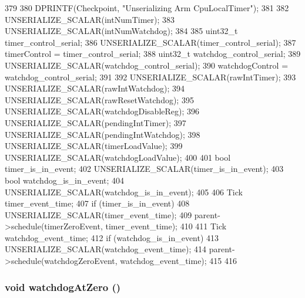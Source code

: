 \begin{DoxyCode}
379 {
380     DPRINTF(Checkpoint, "Unserializing Arm CpuLocalTimer\n");
381 
382     UNSERIALIZE_SCALAR(intNumTimer);
383     UNSERIALIZE_SCALAR(intNumWatchdog);
384 
385     uint32_t timer_control_serial;
386     UNSERIALIZE_SCALAR(timer_control_serial);
387     timerControl = timer_control_serial;
388     uint32_t watchdog_control_serial;
389     UNSERIALIZE_SCALAR(watchdog_control_serial);
390     watchdogControl = watchdog_control_serial;
391 
392     UNSERIALIZE_SCALAR(rawIntTimer);
393     UNSERIALIZE_SCALAR(rawIntWatchdog);
394     UNSERIALIZE_SCALAR(rawResetWatchdog);
395     UNSERIALIZE_SCALAR(watchdogDisableReg);
396     UNSERIALIZE_SCALAR(pendingIntTimer);
397     UNSERIALIZE_SCALAR(pendingIntWatchdog);
398     UNSERIALIZE_SCALAR(timerLoadValue);
399     UNSERIALIZE_SCALAR(watchdogLoadValue);
400 
401     bool timer_is_in_event;
402     UNSERIALIZE_SCALAR(timer_is_in_event);
403     bool watchdog_is_in_event;
404     UNSERIALIZE_SCALAR(watchdog_is_in_event);
405 
406     Tick timer_event_time;
407     if (timer_is_in_event){
408         UNSERIALIZE_SCALAR(timer_event_time);
409         parent->schedule(timerZeroEvent, timer_event_time);
410     }
411     Tick watchdog_event_time;
412     if (watchdog_is_in_event) {
413         UNSERIALIZE_SCALAR(watchdog_event_time);
414         parent->schedule(watchdogZeroEvent, watchdog_event_time);
415     }
416 }
\end{DoxyCode}
\hypertarget{classCpuLocalTimer_1_1Timer_a76d03f76bc4ae7f6d6671b6ac0cd2f7e}{
\subsubsection[{watchdogAtZero}]{\setlength{\rightskip}{0pt plus 5cm}void watchdogAtZero ()}}
\label{classCpuLocalTimer_1_1Timer_a76d03f76bc4ae7f6d6671b6ac0cd2f7e}



